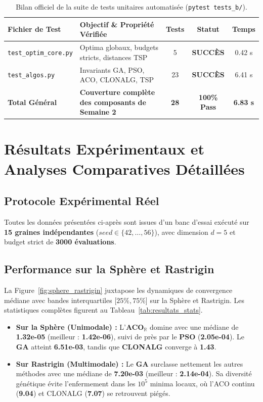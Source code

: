 \documentclass[11pt,a4paper]{article}
\begin{document}
\begin{table}[H]
\centering
\small
\begin{tabularx}{\textwidth}{lXccc}
\toprule
\textbf{Fichier de Test} & \textbf{Objectif \& Propriété Vérifiée} & \textbf{Tests} & \textbf{Statut} & \textbf{Temps} \\
\midrule
\texttt{test\_optim\_core.py} & Optima globaux, budgets stricts, distances TSP & 5 & \textbf{SUCCÈS} & 0.42 s \\
\texttt{test\_algos.py} & Invariants GA, PSO, ACO, CLONALG, TSP & 23 & \textbf{SUCCÈS} & 6.41 s \\
\midrule
\textbf{Total Général} & \textbf{Couverture complète des composants de Semaine 2} & \textbf{28} & \textbf{100\% Pass} & \textbf{6.83 s} \\
\bottomrule
\end{tabularx}
\caption{Bilan officiel de la suite de tests unitaires automatisée (\texttt{pytest tests\_b/}).}
\label{tab:pytest}
\end{table}

\section{Résultats Expérimentaux et Analyses Comparatives Détaillées}

\subsection{Protocole Expérimental Réel}
Toutes les données présentées ci-après sont issues d'un banc d'essai exécuté sur \textbf{15 graines indépendantes} ($seed \in \{42, \dots, 56\}$), avec dimension $d=5$ et budget strict de \textbf{3000 évaluations}.

\subsection{Performance sur la Sphère et Rastrigin}
La Figure~\ref{fig:sphere_rastrigin} juxtapose les dynamiques de convergence médiane avec bandes interquartiles [$25\%, 75\%$] sur la Sphère et Rastrigin. Les statistiques complètes figurent au Tableau~\ref{tab:resultats_stats}.
\begin{itemize}\setlength{\itemsep}{0.1em}
    \item \textbf{Sur la Sphère (Unimodale) :} L'\textbf{ACO}$_\mathbb{R}$ domine avec une médiane de \textbf{1.32e-05} (meilleur : \textbf{1.42e-06}), suivi de près par le \textbf{PSO} (\textbf{2.05e-04}). Le \textbf{GA} atteint \textbf{6.51e-03}, tandis que \textbf{CLONALG} converge à \textbf{1.43}.
    \item \textbf{Sur Rastrigin (Multimodale) :} Le \textbf{GA} surclasse nettement les autres méthodes avec une médiane de \textbf{7.20e-03} (meilleur : \textbf{2.14e-04}). Sa diversité génétique évite l'enfermement dans les $10^5$ minima locaux, où l'ACO continu (\textbf{9.04}) et CLONALG (\textbf{7.07}) se retrouvent piégés.
\end{itemize}
\end{document}
